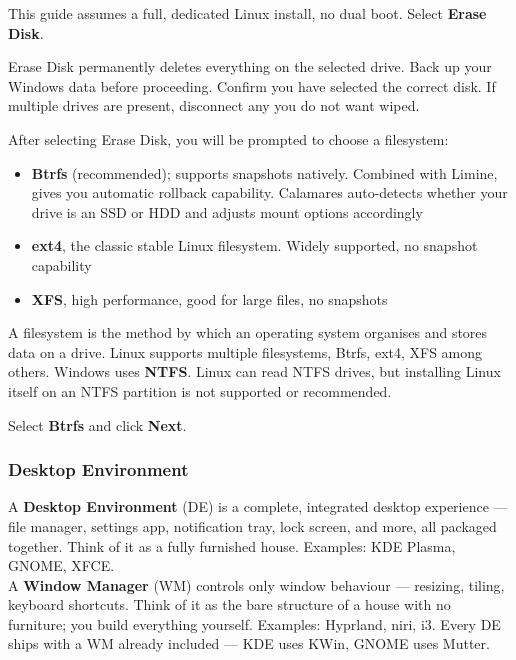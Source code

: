 \documentclass{article}
\begin{document}
This guide assumes a full, dedicated Linux install, no dual boot. Select
\textbf{Erase Disk}.

\begin{tcolorbox}[arc=12pt, outer arc=10pt,
  colback=red!5!white, colframe=red!60!black,
  title=\textbf{Warning}]
  Erase Disk permanently deletes everything on the selected drive. Back up your
  Windows data before proceeding. Confirm you have selected the correct disk.
  If multiple drives are present, disconnect any you do not want wiped.
\end{tcolorbox}

\noindent After selecting Erase Disk, you will be prompted to choose a filesystem:

\begin{itemize}[leftmargin=1.5em, label={\tiny\textbullet}, nosep]
  \item \textbf{Btrfs} (recommended); supports snapshots natively. Combined with
    Limine, gives you automatic rollback capability. Calamares auto-detects whether
    your drive is an SSD or HDD and adjusts mount options accordingly
  \item \textbf{ext4}, the classic stable Linux filesystem. Widely supported, no
    snapshot capability
  \item \textbf{XFS}, high performance, good for large files, no snapshots
\end{itemize}

\begin{tcolorbox}[arc=12pt, outer arc=10pt,
  colback=blue!4!white, colframe=blue!40!black,
  title=\textbf{What is a Filesystem?}]
  A filesystem is the method by which an operating system organises and stores data
  on a drive. Linux supports multiple filesystems, Btrfs, ext4, XFS among others.
  Windows uses \textbf{NTFS}. Linux can read NTFS drives, but installing Linux itself
  on an NTFS partition is not supported or recommended.
\end{tcolorbox}

\noindent Select \textbf{Btrfs} and click \textbf{Next}.

\subsubsection{Desktop Environment}

\begin{tcolorbox}[arc=12pt, outer arc=10pt,
  colback=blue!4!white, colframe=blue!40!black,
  title=\textbf{Desktop Environment vs.\ Window Manager}]
  A \textbf{Desktop Environment} (DE) is a complete, integrated desktop experience ---
  file manager, settings app, notification tray, lock screen, and more, all packaged
  together. Think of it as a fully furnished house. Examples: KDE Plasma, GNOME, XFCE.\\[6pt]
  A \textbf{Window Manager} (WM) controls only window behaviour --- resizing, tiling,
  keyboard shortcuts. Think of it as the bare structure of a house with no furniture;
  you build everything yourself. Examples: Hyprland, niri, i3. Every DE ships with a
  WM already included --- KDE uses KWin, GNOME uses Mutter.
\end{tcolorbox}
\end{document}
